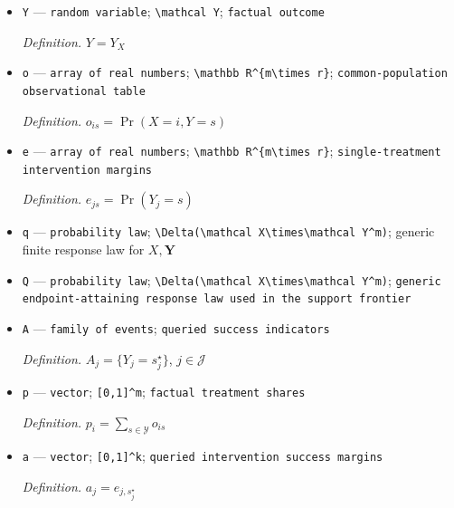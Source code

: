 \documentclass{article}
\begin{document}
\begin{itemize}
  \par\smallskip\noindent\emph{Definition.} \(\mathbf Y=(Y_1,\ldots,Y_m)\)
  \item \texttt{Y} --- \texttt{random variable}; \texttt{\textbackslash{}\allowbreak{}mathcal Y}; \texttt{factual outcome}
  \par\smallskip\noindent\emph{Definition.} \(Y=Y_X\)
  \item \texttt{o} --- \texttt{array of real numbers}; \texttt{\textbackslash{}\allowbreak{}mathbb R\textasciicircum{}\{m\textbackslash{}\allowbreak{}times r\}\allowbreak{}}; \texttt{common-\allowbreak{}population observational table}
  \par\smallskip\noindent\emph{Definition.} \(o_{is}=\Pr(X=i,Y=s)\)
  \item \texttt{e} --- \texttt{array of real numbers}; \texttt{\textbackslash{}\allowbreak{}mathbb R\textasciicircum{}\{m\textbackslash{}\allowbreak{}times r\}\allowbreak{}}; \texttt{single-\allowbreak{}treatment intervention margins}
  \par\smallskip\noindent\emph{Definition.} \(e_{js}=\Pr(Y_j=s)\)
  \item \texttt{q} --- \texttt{probability law}; \texttt{\textbackslash{}\allowbreak{}Delta(\textbackslash{}\allowbreak{}mathcal X\textbackslash{}\allowbreak{}times\textbackslash{}\allowbreak{}mathcal Y\textasciicircum{}m)}; generic finite response law for \(X,\mathbf Y\)
  \item \texttt{Q} --- \texttt{probability law}; \texttt{\textbackslash{}\allowbreak{}Delta(\textbackslash{}\allowbreak{}mathcal X\textbackslash{}\allowbreak{}times\textbackslash{}\allowbreak{}mathcal Y\textasciicircum{}m)}; \texttt{generic endpoint-\allowbreak{}attaining response law used in the support frontier}
  \item \texttt{A} --- \texttt{family of events}; \texttt{queried success indicators}
  \par\smallskip\noindent\emph{Definition.} \(A_j=\{Y_j=s_j^\star\}\), \(j\in\mathcal J\)
  \item \texttt{p} --- \texttt{vector}; \texttt{[0,\allowbreak{}1]\textasciicircum{}m}; \texttt{factual treatment shares}
  \par\smallskip\noindent\emph{Definition.} \(p_i=\sum_{s\in\mathcal Y}o_{is}\)
  \item \texttt{a} --- \texttt{vector}; \texttt{[0,\allowbreak{}1]\textasciicircum{}k}; \texttt{queried intervention success margins}
  \par\smallskip\noindent\emph{Definition.} \(a_j=e_{j,s_j^\star}\)

\end{itemize}
\end{document}
